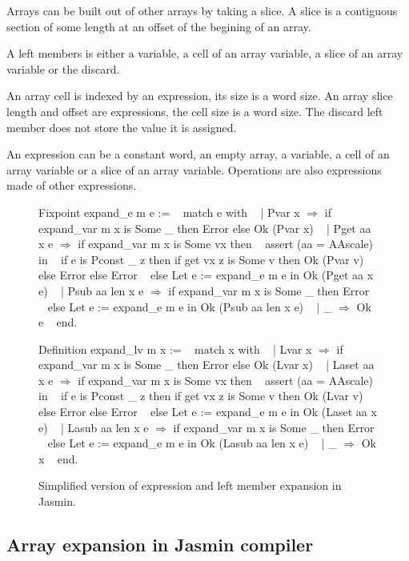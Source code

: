 \documentclass{article}
\begin{document}
Arrays can be built out of other arrays by taking a slice. A slice is a
contiguous section of some length at an offset of the begining of an array.

\smallskip

A left members is either a variable, a cell of an array variable, a slice of an
array variable or the discard.

An array cell is indexed by an expression, its size is a word size. An array
slice length and offset are expressions, the cell size is a word size. The
discard left member does not store the value it is assigned.

An expression can be a constant word, an empty array, a variable, a cell of an
array variable or a slice of an array variable. Operations are also expressions
made of other expressions.

\begin{figure}[t]
\obeylines\obeyspaces\ttfamily%
Fixpoint expand\_e m e := 
~ match e with
~ | Pvar x \(\Rightarrow\) if expand\_var m x is Some \_ then Error else Ok (Pvar x)
~ | Pget aa x e \(\Rightarrow\) if expand\_var m x is Some vx then
~     assert (aa = AAscale) in
~     if e is Pconst \_ z then if get vx z is Some v then Ok (Pvar v)
~     else Error else Error
~   else Let e := expand\_e m e in Ok (Pget aa x e)
~ | Psub aa len x e \(\Rightarrow\) if expand\_var m x is Some \_ then Error
~   else Let e := expand\_e m e in Ok (Psub aa len x e)
~ | \_ \(\Rightarrow\) Ok e
~ end.

Definition expand\_lv m x :=
~ match x with
~ | Lvar x \(\Rightarrow\) if expand\_var m x is Some \_ then Error else Ok (Lvar x)
~ | Laset aa x e \(\Rightarrow\) if expand\_var m x is Some vx then
~     assert (aa = AAscale) in
~     if e is Pconst \_ z then if get vx z is Some v then Ok (Lvar v)
~     else Error else Error
~   else Let e := expand\_e m e in Ok (Laset aa x e)
~ | Lasub aa len x e \(\Rightarrow\) if expand\_var m x is Some \_ then Error
~   else Let e := expand\_e m e in Ok (Lasub aa len x e)
~ | \_ \(\Rightarrow\) Ok x
~ end.
\normalfont%
\caption{Simplified version of expression and left member expansion in Jasmin.}
\end{figure}

\subsection{Array expansion in Jasmin compiler}
\end{document}

